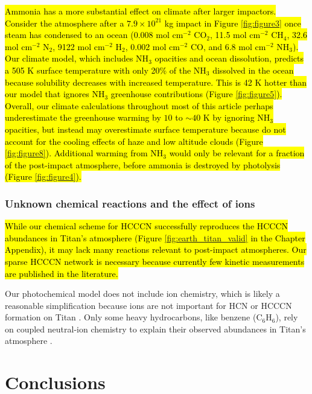 \hl{Ammonia has a more substantial effect on climate after larger impactors. Consider the atmosphere after a $7.9 \times 10^{21}$ kg impact in Figure \mbox{\ref{fig:figure3}} once steam has condensed to an ocean (0.008 mol cm$^{-2}$ CO$_2$, 11.5 mol cm$^{-2}$ CH$_4$, 32.6 mol cm$^{-2}$ N$_2$, 9122 mol cm$^{-2}$ H$_2$, 0.002 mol cm$^{-2}$ CO, and 6.8 mol cm$^{-2}$ NH$_3$). Our climate model, which includes NH$_3$ opacities and ocean dissolution, predicts a 505 K surface temperature with only 20\% of the NH$_3$ dissolved in the ocean because solubility decreases with increased temperature. This is 42 K hotter than our model that ignores NH$_3$ greenhouse contributions (Figure \mbox{\ref{fig:figure5}}). Overall, our climate calculations throughout most of this article perhaps underestimate the greenhouse warming by $10$ to $\sim 40$ K by ignoring NH$_3$ opacities, but instead may overestimate surface temperature because do not account for the cooling effects of haze and low altitude clouds (Figure \mbox{\ref{fig:figure8}}). Additional warming from NH$_3$ would only be relevant for a fraction of the post-impact atmosphere, before ammonia is destroyed by photolysis (Figure \mbox{\ref{fig:figure4}}).}

\subsubsection{Unknown chemical reactions and the effect of ions}

\hl{While our chemical scheme for HCCCN successfully reproduces the HCCCN abundances in Titan's atmosphere (Figure \mbox{\ref{fig:earth_titan_valid}} in the Chapter Appendix), it may lack many reactions relevant to post-impact atmospheres. Our sparse HCCCN network is necessary because currently few kinetic measurements are published in the literature.}

Our photochemical model does not include ion chemistry, which is likely a reasonable simplification because ions are not important for HCN or HCCCN formation on Titan \citep{Loison_2015}. Only some heavy hydrocarbons, like benzene (C$_6$H$_6$), rely on coupled neutral-ion chemistry to explain their observed abundances in Titan's atmosphere \citep{Horst_2017}.

\section{Conclusions}


